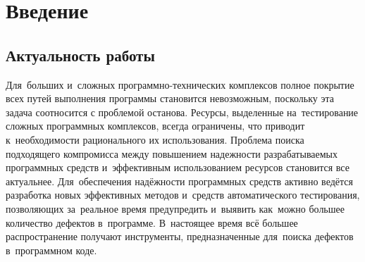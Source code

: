 \chapter*{Введение}							%

\newcommand{\actuality}{}
\newcommand{\aim}{\textbf{Целью}}
\newcommand{\tasks}{задачи}
\newcommand{\defpositions}{\textbf{Основные положения, выносимые на~защиту:}}
\newcommand{\novelty}{\textbf{Научная новизна:}}
\newcommand{\influence}{\textbf{Научная и практическая значимость}}
\newcommand{\reliability}{\textbf{Степень достоверности}}
\newcommand{\probation}{\textbf{Апробация работы.}}
\newcommand{\contribution}{\textbf{Личный вклад.}}
\newcommand{\publications}{\textbf{Публикации.}}

\section*{Актуальность работы}
Для~больших и~сложных программно-технических комплексов полное покрытие всех путей выполнения программы становится невозможным, поскольку эта задача соотносится с проблемой останова. Ресурсы, выделенные на~тестирование сложных программных комплексов, всегда ограничены, что приводит к~необходимости рационального  их использования. Проблема поиска подходящего компромисса  между повышением надежности разрабатываемых программных средств и~эффективным использованием ресурсов становится все актуальнее. Для~обеспечения надёжности программных средств  активно ведётся разработка новых эффективных методов и~средств автоматического тестирования, позволяющих за~реальное время предупредить и~выявить как~можно большее количество дефектов в~программе. В~настоящее время всё большее распространение получают инструменты, предназначенные для~поиска дефектов в~программном коде.

